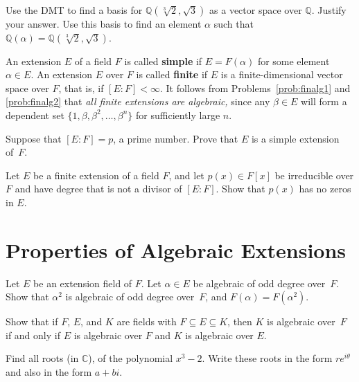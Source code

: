 \begin{problem}
   Use the DMT to find  a basis for $\mathbb{Q}\left(\sqrt[3]{2},\sqrt{3}\right)$ as a vector space over $\mathbb{Q}$.  Justify your answer. Use this basis to find an element $\alpha$ such that $\mathbb{Q}(\alpha) = \mathbb{Q}\left(\sqrt[3]{2},\sqrt{3}\right)$.
\end{problem}

An extension $E$ of a field $F$ is called \textbf{simple} if $E=F(\alpha)$ for some element $\alpha \in E$. An extension $E$ over $F$ is called \textbf{finite} if $E$ is a finite-dimensional vector space over $F$, that is, if $[E:F]<\infty$. It follows from Problems~\ref{prob:finalg1} and \ref{prob:finalg2} that \textit{all finite extensions are algebraic,} since any $\beta\in E$ will form a dependent set $\{1, \beta, \beta^2, \ldots,\beta^n\}$ for sufficiently large $n$.

\begin{problem}
    Suppose that $[E:F]=p$, a prime number. Prove that $E$ is a simple extension of~$F$.
\end{problem}

\begin{problem}
Let $E$ be a finite extension of a field $F$, and let $p(x) \in F[x]$ be irreducible over $F$ and have degree that is not a divisor of $[E:F]$.  Show that $p(x)$ has no zeros in $E$.
\end{problem}

\section{Properties of Algebraic Extensions}

\begin{problem}
Let $E$ be an extension field of $F$.  Let $\alpha \in E$ be algebraic of odd degree over~$F$.  Show that $\alpha^2$ is algebraic of odd degree over~$F$, and $F(\alpha) = F(\alpha^2)$.
\end{problem}

\begin{problem}
Show that if $F$, $E$, and $K$ are fields with $F \subseteq E \subseteq K$, then $K$ is algebraic over~$F$ if and only if $E$ is algebraic over $F$ and $K$ is algebraic over $E$.
\end{problem}

\begin{problem}\label{prob:polarform}
    Find all roots (in $\mathbb{C}$), of the polynomial $x^3-2$. Write these roots in the form $re^{i\theta}$ and also in the form $a+bi$.
\begin{annotation}
\end{annotation}
\end{problem}

